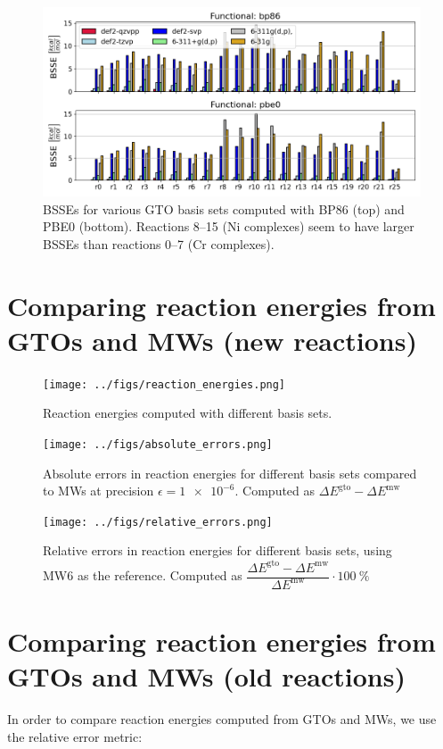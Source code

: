 \documentclass[11pt,a4paper]{article}
\begin{document}
\begin{figure}[H]
	\centering
	\includegraphics[width = \textwidth]{../figs/bsse.png}
	\caption{BSSEs for various GTO basis sets computed with BP86 (top) and PBE0 (bottom). Reactions 8--15 (Ni complexes) seem to have larger BSSEs than reactions 0--7 (Cr complexes).}
	\label{fig: bsse overview}
\end{figure}

\section{Comparing reaction energies from GTOs and MWs (new reactions)}

\begin{figure}[H]
	\centering
	\texttt{[image: ../figs/reaction\_energies.png]}
	\caption{Reaction energies computed with different basis sets.}
	\label{fig: }
\end{figure}

\begin{figure}[H]
	\centering
	\texttt{[image: ../figs/absolute\_errors.png]}
	\caption{Absolute errors in reaction energies for different basis sets compared to MWs at precision $\epsilon = \num{1e-6}$. Computed as $\Delta E^{\text{gto}} - \Delta E^{\text{mw}}$}
	\label{fig: }
\end{figure}

\begin{figure}[H]
	\centering
	\texttt{[image: ../figs/relative\_errors.png]}
	\caption{Relative errors in reaction energies for different basis sets, using MW6 as the reference. Computed as $\dfrac{\Delta E^{\text{gto}} - \Delta E^{\text{mw}}}{\Delta E^{\text{mw}}} \cdot \SI{100}{\percent}$}
	\label{fig: }
\end{figure}

\section{Comparing reaction energies from GTOs and MWs (old reactions)}
In order to compare reaction energies computed from GTOs and MWs, we use the relative error metric:
\end{document}
